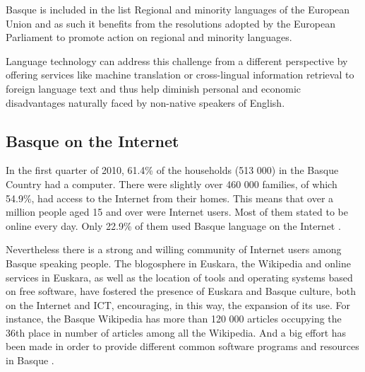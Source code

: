 \begin{multicols}{2}
Basque is included in the list Regional and minority languages of the European Union \cite{BAS-Nota15} and as such it benefits from the resolutions adopted by the European Parliament to promote action on regional and minority languages.

Language technology can address this challenge from a different perspective by offering services like machine translation or cross-lingual information retrieval to foreign language text and thus help diminish personal and economic disadvantages naturally faced by non-native speakers of English.

\subsection{Basque on the Internet}
   In the first quarter of 2010, 61.4\% of the households (513 000) in the Basque Country had a computer. There were slightly over      460 000 families, of which 54.9\%, had access to the Internet from their homes. This means that over a million people aged 15 and over were Internet users. Most of them stated to be online every day. Only 22.9\% of them used Basque language on the Internet \cite{BAS-Nota16}. 


 Nevertheless there is a strong and willing community of Internet users among Basque speaking people. The blogosphere in Euskara, the Wikipedia and online services in Euskara, as well as the location of tools and operating systems based on free software, have fostered the presence of Euskara and Basque culture, both on the Internet and ICT, encouraging, in this way, the expansion of its use. For instance, the Basque Wikipedia has more than 120 000 articles occupying the 36th place in number of articles among all the Wikipedia. And a big effort has been made in order to provide different common software programs \cite{BAS-Nota17,BAS-Nota18}  and resources in Basque \cite{BAS-Nota19,BAS-Nota20,BAS-Nota21,BAS-Nota22, BAS-Nota22b}.



\end{multicols}
